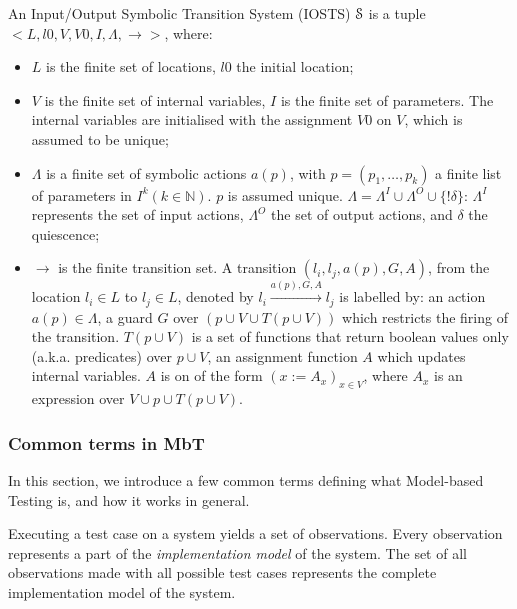 \begin{definition}
An Input/Output Symbolic Transition System (IOSTS) $\EuScript{S}$
is a tuple $< L,l0,V,V0,I,\Lambda,\rightarrow>$, where:

\begin{itemize}
\item $L$ is the finite set of locations, $l0$ the initial
location;

\item $V$ is the finite set of internal variables, $I$ is the
finite set of parameters. The internal variables are initialised
with the assignment $V0$ on $V$, which is assumed to be unique;

\item $\Lambda$ is a finite set of symbolic actions $a(p)$, with
$p = (p_1,\dots,p_k)$ a finite list of parameters in $I^k(k \in
\mathbb{N})$. $p$ is assumed unique. $\Lambda= \Lambda^I  \cup
\Lambda^O \cup \{!\delta \}$: $\Lambda^I$ represents the set of
input actions, $\Lambda^O$ the set of output actions, and
$\delta$ the quiescence;

\item $\rightarrow$ is the finite transition set. A transition
$(l_i,l_j,a(p),G,A)$, from the location $l_i \in L$ to $l_j \in
L$, denoted by $l_i \xrightarrow{a(p),G,A} l_j$ is labelled by: an
action $a(p) \in \Lambda$, a guard  $G$ over $(p \cup V \cup T(p
\cup V))$ which restricts the firing of the transition. $T(p \cup
V)$ is a set of functions that return boolean values only (a.k.a.
predicates) over $p \cup V$, an assignment function $A$ which
updates internal variables. $A$ is on of the form $(x:=A_x)_{x\in
V}$, where $A_x$ is an expression over $V \cup p \cup T(p \cup
V)$.
\end{itemize}
\end{definition}

\subsubsection{Common terms in MbT}

In this section, we introduce a few common terms defining what
Model-based Testing is, and how it works in general.

Executing a test case on a system yields a set of observations.
Every observation represents a part of the \textit{implementation
model} of the system. The set of all observations made with all
possible test cases represents the complete implementation model
of the system.


